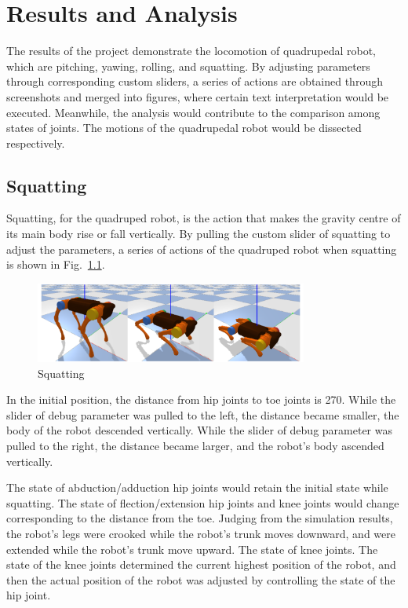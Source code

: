 \chapter{Results and Analysis}

The results of the project demonstrate the locomotion of quadrupedal robot, which are pitching, yawing, rolling, and squatting. By adjusting parameters through corresponding custom sliders, a series of actions are obtained through screenshots and merged into figures, where certain text interpretation would be executed. Meanwhile, the analysis would contribute to the comparison among states of joints. The motions of the quadrupedal robot would be dissected respectively.  


\section{Squatting}

Squatting, for the quadruped robot, is the action that makes the gravity centre of its main body rise or fall vertically. By pulling the custom slider of squatting to adjust the parameters, a series of actions of the quadruped robot when squatting is shown in Fig.~\ref{fig: squatting}.

\begin{figure}[htbp]
    \centering
    \includegraphics[width=0.8\textwidth]{figures/squatting.png}
    \caption{Squatting}
    \label{fig: squatting}
\end{figure}

In the initial position, the distance from hip joints to toe joints is 270. While the slider of debug parameter was pulled to the left, the distance became smaller, the body of the robot descended vertically. While the slider of debug parameter was pulled to the right, the distance became larger, and the robot's body ascended vertically.

The state of abduction/adduction hip joints would retain the initial state while squatting. The state of flection/extension hip joints and knee joints would change corresponding to the distance from the toe. Judging from the simulation results, the robot's legs were crooked while the robot's trunk moves downward, and were extended while the robot's trunk move upward. The state of knee joints. The state of the knee joints determined the current highest position of the robot, and then the actual position of the robot was adjusted by controlling the state of the hip joint.



